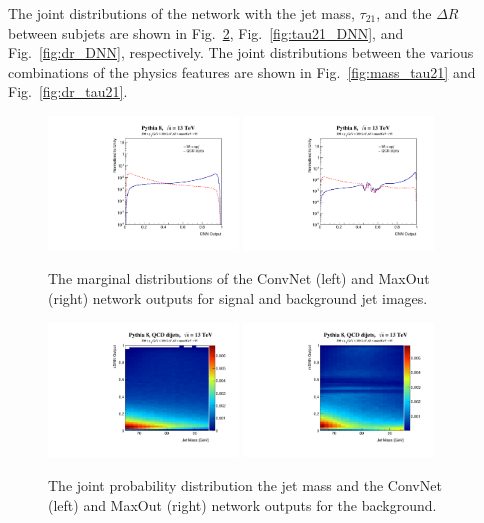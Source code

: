\documentclass{article}
\begin{document}
The joint distributions of the network with the jet mass, $\tau_{21}$, and the $\Delta R$ between subjets are shown in Fig.~\ref{fig:mass_DNN}, Fig.~\ref{fig:tau21_DNN}, and Fig.~\ref{fig:dr_DNN}, respectively.  The joint distributions between the various combinations of the physics features are shown in Fig.~\ref{fig:mass_tau21} and Fig.~\ref{fig:dr_tau21}.

\begin{figure}[htbp!]
  \begin{center}
        \includegraphics[width=0.45\textwidth]{figures/convnet.pdf} \includegraphics[width=0.45\textwidth]{figures/maxout.pdf}
      \caption{ The marginal distributions of the ConvNet (left) and MaxOut (right) network outputs for signal and background jet images.
      \label{fig:marginal_DNN} }
    \end{center}
\end{figure}

\begin{figure}[htbp!]
  \begin{center}
        \includegraphics[width=0.45\textwidth]{figures/mass_convnet_back.pdf} \includegraphics[width=0.45\textwidth]{figures/mass_maxout_back.pdf}
      \caption{ The joint probability distribution the jet mass and the ConvNet (left) and MaxOut (right) network outputs for the background. 
      \label{fig:mass_DNN} }
    \end{center}
\end{figure}
\end{document}
